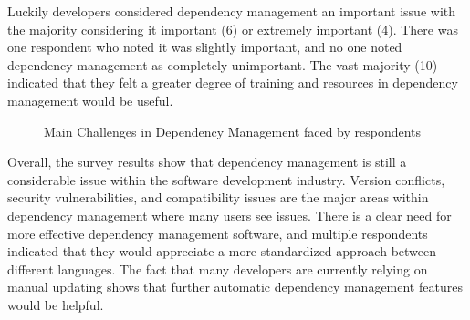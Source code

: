 \documentclass[sigconf]{acmart}
\begin{document}
Luckily developers considered dependency management an important issue with the majority considering it important (6) or extremely important (4). There was one respondent who noted it was slightly important, and no one noted dependency management as completely unimportant. The vast majority (10) indicated that they felt a greater degree of training and resources in dependency management would be useful.

\begin{figure}[h]
	\centering
	\caption{Main Challenges in Dependency Management faced by respondents}
	\label{fig:challenges}
\end{figure}

Overall, the survey results show that dependency management is still a considerable issue within the software development industry. Version conflicts, security vulnerabilities, and compatibility issues are the major areas within dependency management where many users see issues. There is a clear need for more effective dependency management software, and multiple respondents indicated that they would appreciate a more standardized approach between different languages. The fact that many developers are currently relying on manual updating shows that further automatic dependency management features would be helpful.



\end{document}
